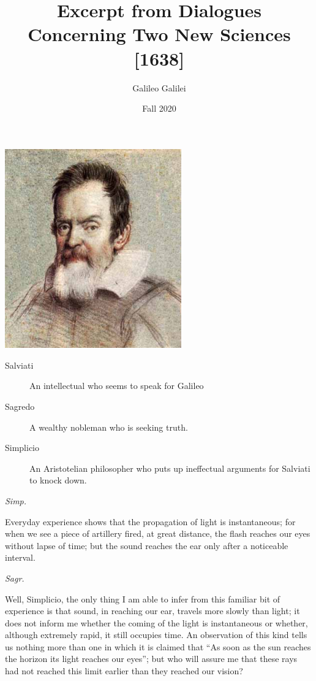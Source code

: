 \documentclass{article}
\begin{document}
\title{Excerpt from Dialogues Concerning Two New Sciences [1638]}
\author{Galileo Galilei}
\date{Fall 2020}
\maketitle

\begin{center}
\includegraphics[width=3in]{../images/Galileo_9.jpeg}
\end{center}

\begin{description}
\item[Salviati] An intellectual who seems to speak for Galileo 
\item[Sagredo]  A wealthy nobleman who is seeking truth. 
\item[Simplicio]  An Aristotelian philosopher who puts up ineffectual arguments for Salviati to knock down.
\end{description}


{\em Simp.}

Everyday experience shows that the propagation of light is instantaneous; for when we see a piece of artillery fired, at great distance, the flash reaches our eyes without lapse of time; but the sound reaches the ear only after a noticeable interval.

{\em Sagr.}

Well, Simplicio, the only thing I am able to infer from this familiar bit of experience is that sound, in reaching our ear, travels more slowly than light; it does not inform me whether the coming of the light is instantaneous or whether, although extremely rapid, it still occupies time. An observation of this kind tells us nothing more than one in which it is claimed that “As soon as the sun reaches the horizon its light reaches our eyes”; but who will assure me that these rays had not reached this limit earlier than they reached our vision?
\end{document}
